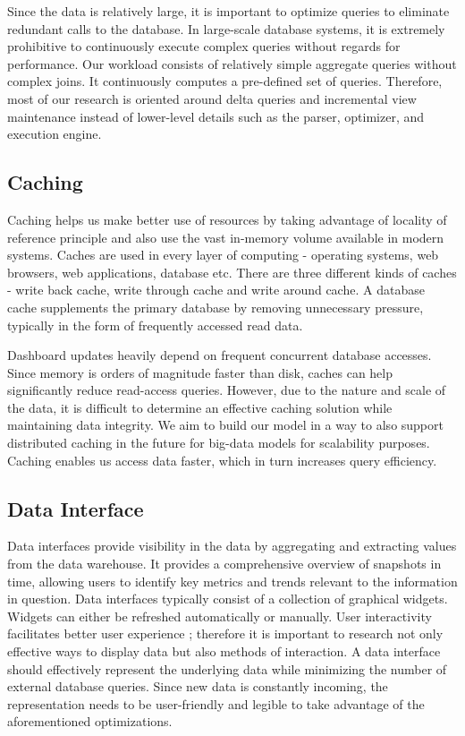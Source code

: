 Since the data is relatively large, it is important to optimize queries to eliminate redundant calls to the database. In large-scale database systems, it is extremely prohibitive to continuously execute complex queries without regards for performance. Our workload consists of relatively simple aggregate queries without complex joins. It continuously computes a pre-defined set of queries. Therefore, most of our research is oriented around delta queries and incremental view maintenance instead of lower-level details such as the parser, optimizer, and execution engine.

\subsection{Caching}
Caching helps us make better use of resources by taking advantage of locality of reference principle and also use the vast in-memory volume available in modern systems. Caches are used in every layer of computing - operating systems, web browsers, web applications, database etc. There are three different kinds of caches - write back cache, write through cache and write around cache. A database cache supplements the primary database by removing unnecessary pressure, typically in the form of frequently accessed read data. 

Dashboard updates heavily depend on frequent concurrent database accesses. Since memory is orders of magnitude faster than disk, caches can help significantly reduce read-access queries. However, due to the nature and scale of the data, it is difficult to determine an effective caching solution while maintaining data integrity. We aim to build our model in a way to also support distributed caching in the future for big-data models\cite{Caching} for scalability purposes. Caching enables us access data faster, which in turn increases query efficiency. 

\subsection{Data Interface}
Data interfaces provide visibility in the data by aggregating and extracting values from the data warehouse. It provides a comprehensive overview of snapshots in time, allowing users to identify key metrics and trends relevant to the information in question. Data interfaces typically consist of a collection of graphical widgets. Widgets can either be refreshed automatically or manually. User interactivity facilitates better user experience \cite{DirectManipulation}; therefore it is important to research not only effective ways to display data but also methods of interaction. A data interface should effectively represent the underlying data while minimizing the number of external database queries. Since new data is constantly incoming, the representation needs to be user-friendly and legible to take advantage of the aforementioned optimizations.

